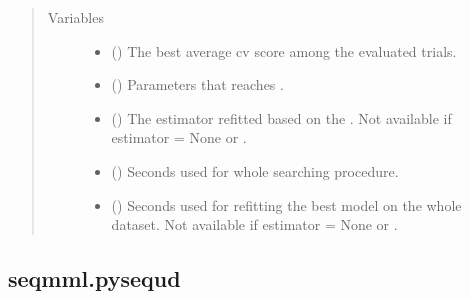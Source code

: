 \documentclass[letterpaper,10pt,english]{sphinxmanual}
\begin{document}
\begin{fulllineitems}
\begin{sphinxVerbatim}[commandchars=\\\{\}]
 
\end{sphinxVerbatim}
\begin{quote}\begin{description}
\item[{Variables}] \leavevmode\begin{itemize}
\item {} 
 () \textendash{} The best average cv score among the evaluated trials.

\item {} 
 () \textendash{} Parameters that reaches .

\item {} 
 () \textendash{} The estimator refitted based on the . 
Not available if estimator = None or .

\item {} 
 () \textendash{} Seconds used for whole searching procedure.

\item {} 
 () \textendash{} Seconds used for refitting the best model on the whole dataset.
Not available if estimator = None or .

\end{itemize}

\end{description}\end{quote}

\end{fulllineitems}



\subsection{seqmml.pysequd}
\label{\detokenize{apidoc:seqmml-pysequd}}
\end{document}
